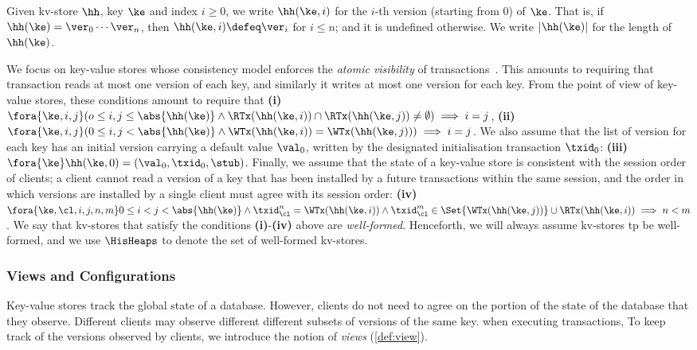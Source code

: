 Given kv-store $\hh$, key $\ke$ and index $i \geq 0$, 
we write $\hh(\ke, i)$ for the $i$-th version (starting from $0$) of $\ke$.
That is, if $\hh(\ke) = \ver_0 \cdots\ver_{n}$, then $\hh(\ke, i) \defeq \ver_{i}$ for $i \leq n$; 
and it is undefined otherwise. 
We write $\lvert \hh(\ke) \rvert$ for the length of $\hh(\ke)$. 

We focus on key-value stores whose consistency model enforces the \emph{atomic visibility} of transactions~\cite{framework-concur}. 
This amounts to requiring that transaction reads at most one version of each key, and similarly 
it writes at most one version for each key. From the point of view of key-value stores, 
these conditions amount to require that \textbf{(i)}
$\fora{\ke, i, j} (o \leq i, j \leq \abs{ \hh(\ke) } \land \RTx(\hh(\ke, i)) \cap \RTx(\hh(\ke, j)) \neq \emptyset ) \implies i = j$, 
\textbf{(ii)}
$\fora{\ke, i, j} (0 \leq i,j < \abs{ \hh(\ke) } \wedge \WTx(\hh(\ke, i)) = \WTx(\hh(\ke, j)) ) \implies i = j$. 
We also assume that the list of version for each key has an initial version carrying a default value $\val_0$, 
written by the designated initialisation transaction $\txid_0$: \textbf{(iii)} $\fora{\ke} \hh(\ke, 0) = (\val_0, \txid_0, \stub)$.
Finally, we assume that the state of a key-value store is consistent with 
the session order of clients; a client cannot read a version of a key that has 
been installed by a future transactions within the same session, and 
the order in which versions are installed by a single client must agree 
with its session order: \textbf{(iv)}
$\fora{ \ke, \cl, i,j, n, m} 0 \leq i < j < \abs{\hh(\ke)} 
    \land \txid_{\cl}^{n} = \WTx(\hh(\ke,i)) {} \wedge \txid_{\cl}^{m} \in \Set{\WTx(\hh(\ke,j))} \cup \RTx(\hh(\ke, i))
    \implies n < m $.
We say that kv-stores that satisfy the conditions \textbf{(i)}-\textbf{(iv)} above are 
\emph{well-formed}.
Henceforth, we will always assume kv-stores tp be well-formed, and we use $\HisHeaps$ to denote 
the set of well-formed kv-stores.

\subsubsection{Views and Configurations}

Key-value stores track the global state of a database. 
However, clients do not need to agree on the portion of 
the state of the database that they observe. Different clients 
may observe different different subsets of versions of the same key.
when executing transactions,
To keep track of the versions observed by clients,
we introduce the notion of \emph{views} (\cref{def:view}). 

